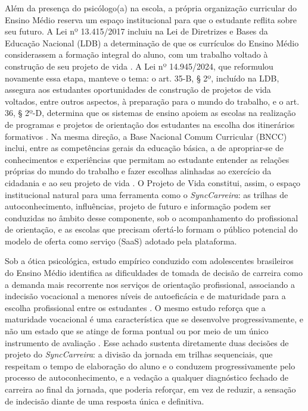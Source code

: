 Além da presença do psicólogo(a) na escola, a própria organização curricular do Ensino Médio reserva um espaço institucional para que o estudante reflita sobre seu futuro. A Lei nº 13.415/2017 incluiu na Lei de Diretrizes e Bases da Educação Nacional (LDB) a determinação de que os currículos do Ensino Médio considerassem a formação integral do aluno, com um trabalho voltado à construção de seu projeto de vida \cite{brasil2017lei13415}. A Lei nº 14.945/2024, que reformulou novamente essa etapa, manteve o tema: o art. 35-B, § 2º, incluído na LDB, assegura aos estudantes oportunidades de construção de projetos de vida voltados, entre outros aspectos, à preparação para o mundo do trabalho, e o art. 36, § 2º-D, determina que os sistemas de ensino apoiem as escolas na realização de programas e projetos de orientação dos estudantes na escolha dos itinerários formativos \cite{brasil2024lei14945}. Na mesma direção, a Base Nacional Comum Curricular (BNCC) inclui, entre as competências gerais da educação básica, a de apropriar-se de conhecimentos e experiências que permitam ao estudante entender as relações próprias do mundo do trabalho e fazer escolhas alinhadas ao exercício da cidadania e ao seu projeto de vida \cite{brasil2018bncc}. O Projeto de Vida constitui, assim, o espaço institucional natural para uma ferramenta como o \textit{SyncCarreira}: as trilhas de autoconhecimento, influências, projeto de futuro e informação podem ser conduzidas no âmbito desse componente, sob o acompanhamento do profissional de orientação, e as escolas que precisam ofertá-lo formam o público potencial do modelo de oferta como serviço (SaaS) adotado pela plataforma.

Sob a ótica psicológica, estudo empírico conduzido com adolescentes brasileiros do Ensino Médio identifica as dificuldades de tomada de decisão de carreira como a demanda mais recorrente nos serviços de orientação profissional, associando a indecisão vocacional a menores níveis de autoeficácia e de maturidade para a escolha profissional entre os estudantes \cite{silva2021}. O mesmo estudo reforça que a maturidade vocacional é uma característica que se desenvolve progressivamente, e não um estado que se atinge de forma pontual ou por meio de um único instrumento de avaliação \cite{silva2021}. Esse achado sustenta diretamente duas decisões de projeto do \textit{SyncCarreira}: a divisão da jornada em trilhas sequenciais, que respeitam o tempo de elaboração do aluno e o conduzem progressivamente pelo processo de autoconhecimento, e a vedação a qualquer diagnóstico fechado de carreira ao final da jornada, que poderia reforçar, em vez de reduzir, a sensação de indecisão diante de uma resposta única e definitiva.

